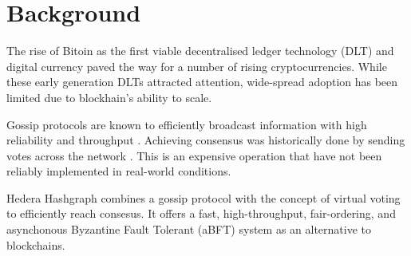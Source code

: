 \section{Background}

The rise of Bitoin \cite{nakamoto2008peer} as the first viable decentralised ledger technology (DLT) and digital currency paved the way for a number of rising cryptocurrencies. While these early generation DLTs attracted attention, wide-spread adoption has been limited due to blockhain's ability to scale. 


Gossip protocols are known to efficiently broadcast information with high reliability and throughput \cite{birman}. Achieving consensus was historically done by sending votes across the network \cite{berman1989towards}. This is an expensive operation that have not been reliably implemented in real-world conditions.

Hedera Hashgraph\cite{baird2016} combines a gossip protocol with the concept of virtual voting to efficiently reach consesus. It offers a fast, high-throughput, fair-ordering, and asynchonous Byzantine Fault Tolerant (aBFT) system as an alternative to blockchains.
